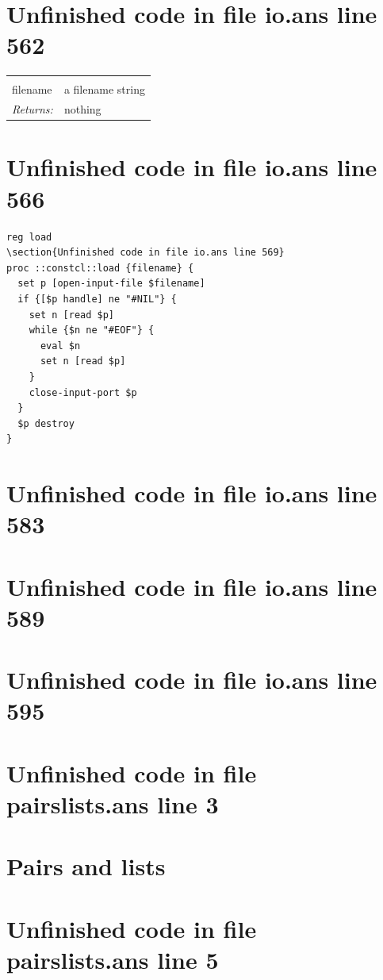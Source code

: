 \documentclass[twoside,9pt]{report}
\begin{document}
\section{Unfinished code in file io.ans line 562}
\noindent\begin{tabular}{ |p{1.9cm} p{8cm}| }
\hline
\rowcolor[HTML]{CCCCCC} \multicolumn{2}{|l|}{\bf load (public)} \\
filename & a filename string \\
\textit{Returns:} & nothing \\
\hline
\end{tabular}
\section{Unfinished code in file io.ans line 566}
\begin{lstlisting}
reg load
\section{Unfinished code in file io.ans line 569}
proc ::constcl::load {filename} {
  set p [open-input-file $filename]
  if {[$p handle] ne "#NIL"} {
    set n [read $p]
    while {$n ne "#EOF"} {
      eval $n
      set n [read $p]
    }
    close-input-port $p
  }
  $p destroy
}
\end{lstlisting}
\section{Unfinished code in file io.ans line 583}
\section{Unfinished code in file io.ans line 589}
\section{Unfinished code in file io.ans line 595}
\section{Unfinished code in file pairslists.ans line 3}
\section{Pairs and lists}
\label{pairs-and-lists}
\section{Unfinished code in file pairslists.ans line 5}
\end{document}
